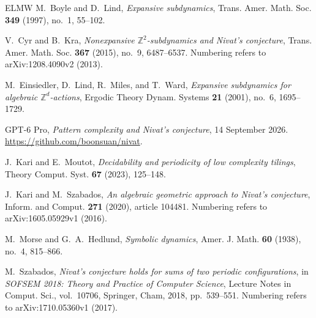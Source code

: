 \documentclass[11pt,a4paper,reqno]{amsart}
\theoremstyle{definition}
\theoremstyle{remark}
\numberwithin{equation}{section}
\begin{document}
\begin{thebibliography}{ELMW}
M.~Boyle and D.~Lind,
\emph{Expansive subdynamics},
Trans. Amer. Math. Soc. \textbf{349} (1997), no.~1, 55--102.

V.~Cyr and B.~Kra,
\emph{Nonexpansive $\mathbb Z^2$-subdynamics and Nivat's conjecture},
Trans. Amer. Math. Soc. \textbf{367} (2015), no.~9, 6487--6537.
Numbering refers to arXiv:1208.4090v2 (2013).

M.~Einsiedler, D.~Lind, R.~Miles, and T.~Ward,
\emph{Expansive subdynamics for algebraic $\mathbb Z^d$-actions},
Ergodic Theory Dynam. Systems \textbf{21} (2001), no.~6, 1695--1729.

GPT-6 Pro,
\emph{Pattern complexity and Nivat's conjecture}, 14 September 2026.
\url{https://github.com/boonsuan/nivat}.

J.~Kari and E.~Moutot,
\emph{Decidability and periodicity of low complexity tilings},
Theory Comput. Syst. \textbf{67} (2023), 125--148.

J.~Kari and M.~Szabados,
\emph{An algebraic geometric approach to Nivat's conjecture},
Inform. and Comput. \textbf{271} (2020), article 104481.
Numbering refers to arXiv:1605.05929v1 (2016).

M.~Morse and G.~A.~Hedlund,
\emph{Symbolic dynamics},
Amer. J. Math. \textbf{60} (1938), no.~4, 815--866.

M.~Szabados,
\emph{Nivat's conjecture holds for sums of two periodic configurations},
in \emph{SOFSEM 2018: Theory and Practice of Computer Science},
Lecture Notes in Comput. Sci., vol.~10706, Springer, Cham, 2018, pp.~539--551.
Numbering refers to arXiv:1710.05360v1 (2017).
\end{thebibliography}
\end{document}
